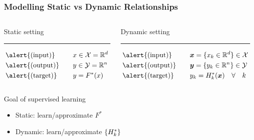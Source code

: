 \begin{frame}
    \frametitle{Modelling Static vs Dynamic Relationships}

    \begin{columns}[T] %
        \begin{column}{.48\textwidth}
            {
                \color{nusorange}
                Static setting
                \rule{\linewidth}{4pt}
            }
            \begin{equation*}
                \begin{aligned}
                    &\text{\alert{(input)}}
                    \quad
                    &&x\in \Xcal = \R^d \\
                    &\text{\alert{(output)}}
                    \quad
                    &&y \in \Ycal = \R^n \\
                    &\text{\alert{(target)}}
                    \quad
                    &&y = F^*(x)
                \end{aligned}
            \end{equation*}
        \end{column}%
        \hfill%
        \pause{}
        \begin{column}{.48\textwidth}
            {
                \color{nusgreen}
                Dynamic setting
                \rule{\linewidth}{4pt}
            }
            \begin{equation*}
                \begin{aligned}
                    &\text{\alert{(input)}}
                    \quad
                    &&\*x = \{ x_k \in \R^d \} \in \Xcal
                    \\
                    &\text{\alert{(output)}}
                    \quad
                    &&\*y = \{ y_k \in \R^n \} \in \Ycal
                    \\
                    &\text{\alert{(target)}}
                    \quad
                    &&y_k = H_k^*(\*x) \quad \forall \quad k
                \end{aligned}
            \end{equation*}
        \end{column}%
    \end{columns}

    \vspace{.5cm}

    \pause{}

    Goal of supervised learning
    \begin{itemize}
        \item Static: learn/approximate $F^*$
        \item Dynamic: learn/approximate $\{ H^*_k \}$
    \end{itemize}

\end{frame}


